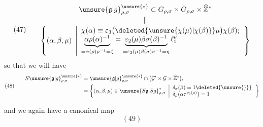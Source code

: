 \[
(47)\qquad
\begin{gathered}
\unsure{\mathfrak{g}|g}_{\rho,\sigma}^{\unsure{*}}
\subset G_{\rho,\sigma}\times G_{\rho,\sigma}
\times\widehat{\mathbb Z}^{*}
\\[-2pt]
\Vert\\[-2pt]
\left\{(\alpha,\beta,\mu)\ \left|
\begin{array}{l}
\chi(\alpha)\equiv\varepsilon_3
\bigl(\deleted{\unsure{\chi(\mu)|\chi(\beta)}}\mu\bigr)
\chi(\beta);\\
\underbrace{\alpha\rho(\alpha)^{-1}}_{=\alpha(\rho)\rho^{-1}=\zeta}
=
\underbrace{\varepsilon_2(\mu)\beta\sigma(\beta)^{-1}}_
{=\varepsilon_2(\mu)\beta(\sigma)\sigma^{-1}=\eta}
\ell_1^\nu
\end{array}\right.\right\}
\end{gathered}
\]
so that we will have
\[
(48)\qquad
\begin{aligned}
S\unsure{\mathfrak{g}|g}_{\rho,\sigma}^{\unsure{*}}
&=\unsure{\mathfrak{g}|g}_{\rho,\sigma}^{\unsure{*}}
\cap\bigl(\mathcal{G}'\times\mathcal{G}\times\widehat{\mathbb Z}^{*}\bigr),
\\
&=\left\{(\alpha,\beta,\mu)\in
\unsure{S\mathfrak{g}|Sg}_{\rho,\sigma}^{*}
\ \left|
\begin{array}{l}
\delta_\sigma(\beta)=1\deleted{\unsure{\}}}\\
\delta_\rho\bigl(\alpha\tau^{\nu_3(\mu)}\bigr)=1
\end{array}\right.\right\}
\end{aligned}
\]


and we again have a canonical map
\[
(49)
\]

